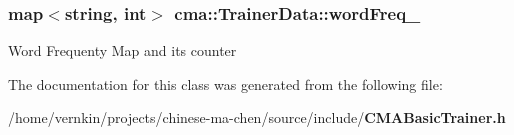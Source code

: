 \subsubsection[{wordFreq\_\-}]{\setlength{\rightskip}{0pt plus 5cm}map$<$string, int$>$ {\bf cma::TrainerData::wordFreq\_\-}}\label{classcma_1_1TrainerData_a1d9d4c16f23c5885d8dfa8c4989be181}
Word Frequenty Map and its counter 

The documentation for this class was generated from the following file:\begin{DoxyCompactItemize}
\item 
/home/vernkin/projects/chinese-\/ma-\/chen/source/include/{\bf CMABasicTrainer.h}\end{DoxyCompactItemize}
